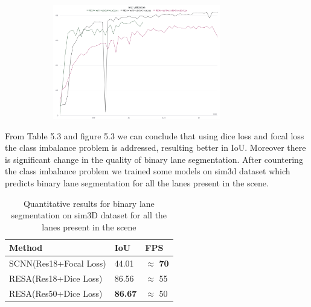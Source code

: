      \begin{figure}[h]
       \caption{IoU for binary lane segmentation trained on sim3D dataset with cross entropy, dice and focal loss.}
        \centering
        \begin{subfigure}{0.6\textwidth}
        \includegraphics[width=1\linewidth, height=5cm]{images/binseg_IOU.png} 
        \label{fig:subim1}
        \end{subfigure}
        \end{figure}
    
    From Table 5.3 and figure 5.3 we can conclude that using dice loss and focal loss the class imbalance problem is addressed, resulting better in IoU. Moreover there is significant change in the quality of binary lane segmentation.
        After countering the class imbalance problem we trained some models on sim3d dataset which predicts binary lane segmentation for all the lanes present in the scene.
        
        
           \begin{table}[h!]
    \caption{Quantitative results for binary lane segmentation on sim3D dataset for all the lanes present in the scene}
    \centering
    \begin{tabular}{|l|l|l|}
    \hline
        \textbf{Method} & \textbf{IoU} & \textbf{FPS} \\ \hline
        SCNN(Res18+Focal Loss) & 44.01 & $\approx$ \textbf{70} \\\hline
        RESA(Res18+Dice Loss) & 86.56 & $\approx$ 55 \\\hline
        RESA(Res50+Dice Loss) & \textbf{86.67} & $\approx$ 50 \\\hline
    \end{tabular}
\end{table}
        
